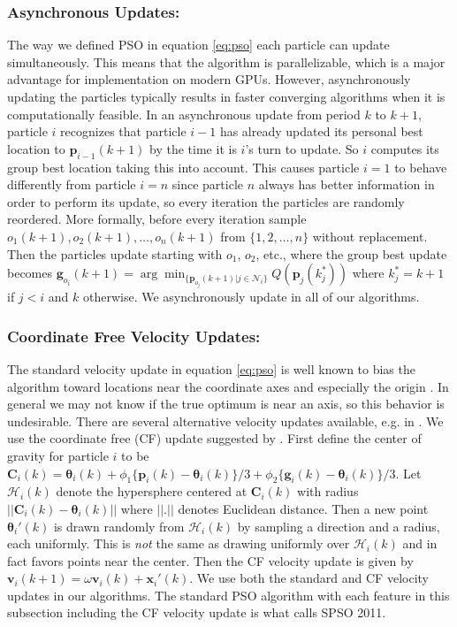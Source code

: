 \documentclass[cmbright]{staauth}
\begin{document}
\subsubsection{Asynchronous Updates:}
The way we defined PSO in equation \eqref{eq:pso} each particle can update simultaneously. This means that the algorithm is parallelizable, which is a major advantage for implementation on modern GPUs. However, asynchronously updating the particles typically results in faster converging algorithms when it is computationally feasible. In an asynchronous update from period $k$ to $k+1$, particle $i$ recognizes that particle $i-1$ has already updated its personal best location to $\bm{p}_{i-1}(k+1)$ by the time it is $i$'s turn to update. So $i$ computes its group best location taking this into account. This causes particle $i=1$ to behave differently from particle $i=n$ since particle $n$ always has better information in order to perform its update, so every iteration the particles are randomly reordered. More formally, before every iteration sample $o_1(k+1), o_2(k+1), \dots, o_{n}(k+1)$ from $\{1,2,\dots,n\}$ without replacement. Then the particles update starting with $o_1$, $o_2$, etc., where the group best update becomes $\bm{g}_{o_i}(k+1) = \arg\min_{\{\bm{p}_{o_j}(k+1)|j\in\mathcal{N}_i\}}Q(\bm{p}_j(k_j^*))$ where $k^*_j=k+1$ if $j<i$ and $k$ otherwise. We asynchronously update in all of our algorithms.

\subsubsection{Coordinate Free Velocity Updates:}
The standard velocity update in equation \eqref{eq:pso} is well known to bias the algorithm toward locations near the coordinate axes and especially the origin \citep{monson2005exposing,spears2010biases}. In general we may not know if the true optimum is near an axis, so this behavior is undesirable. There are several alternative velocity updates available, e.g. in \citet{monson2005exposing}. We use the coordinate free (CF) update suggested by \citet{clerc2011spso}. First define the center of gravity for particle $i$ to be $\bm{C}_i(k) = \bm{\theta}_i(k) + \phi_1\{\bm{p}_i(k) - \bm{\theta}_i(k)\}/3 + \phi_2\{\bm{g}_i(k) - \bm{\theta}_i(k)\}/3$. Let $\mathcal{H}_i(k)$ denote the hypersphere centered at $\bm{C}_i(k)$ with radius $||\bm{C}_i(k) - \bm{\theta}_i(k)||$ where $||.||$ denotes Euclidean distance. Then a new point $\bm{\theta}_i'(k)$ is drawn randomly from $\mathcal{H}_i(k)$ by sampling a direction and a radius, each uniformly. This is \emph{not} the same as drawing uniformly over $\mathcal{H}_i(k)$ and in fact favors points near the center. Then the CF velocity update is given by $\bm{v}_i(k+1) = \omega \bm{v}_i(k) + \bm{x}_i'(k)$. We use both the standard and CF velocity updates in our algorithms. The standard PSO algorithm with each feature in this subsection including the CF velocity update is what \citet{clerc2011spso} calls SPSO 2011.
\end{document}
